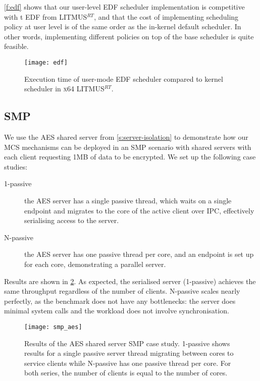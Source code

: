 \autoref{f:edf} shows that our user-level EDF scheduler implementation is
competitive with t EDF from LITMUS$^{RT}$, and
that the cost of implementing scheduling policy at user level is of
the same order as the in-kernel default scheduler. In other words,
implementing different policies on top of the base scheduler is quite feasible.

\begin{figure}[t]
    \centering
    \texttt{[image: edf]}
    \caption{Execution time of \selfour user-mode EDF scheduler compared to
             kernel scheduler in \textsc{x64} LITMUS$^{RT}$.}
    \label{f:edf}
\end{figure}

\subsection{SMP}


We use the \gls{AES} shared server from \cref{s:server-isolation} to demonstrate how our MCS
mechanisms can be deployed in an SMP scenario with shared servers with each client requesting 1MB of 
data to be encrypted. We set up the following case studies:

\begin{description}
    \item[1-passive] the AES server has a single passive thread, which waits on a single endpoint
        and migrates to the core of the active client over IPC, effectively serialising access to the server.
    \item[N-passive] the AES server has one passive thread per core, and an endpoint is set up for
        each core, demonstrating a parallel server.   
\end{description}

Results are shown in \cref{f:evaluation-smp-aes}. As expected, the serialised server (1-passive) achieves the
same throughput regardless of the number of clients. N-passive scales nearly perfectly, as the
benchmark does not have any bottlenecks: the server does minimal system calls and the workload does
not involve synchronisation. 

\begin{figure}[ht] 
    \centering
    \texttt{[image: smp\_aes]}
    \caption{Results of the AES shared server SMP case study. 1-passive shows results for a single
        passive server thread migrating between cores to service clients while N-passive has one
        passive thread per core. For both series, the number of clients is equal to the number of
        cores. }
    \label{f:evaluation-smp-aes}
\end{figure}


